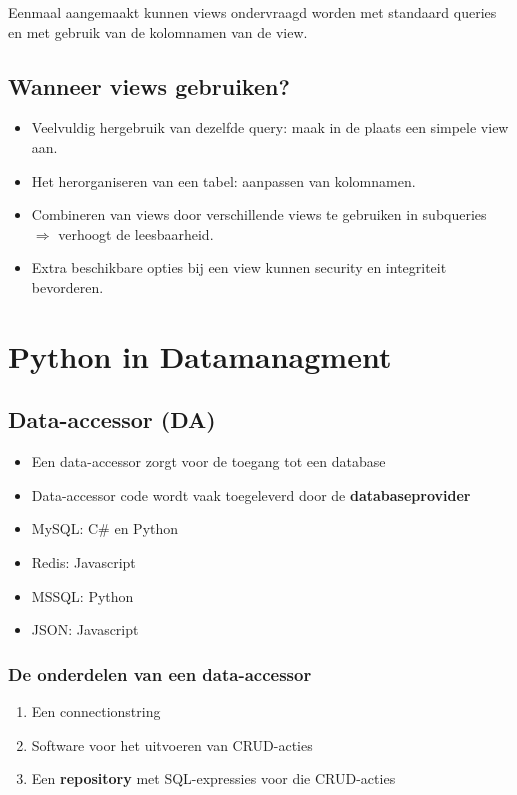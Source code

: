 \documentclass{article}
\newcommand{\bold}[1]{\textbf{#1}}
\begin{document}
Eenmaal aangemaakt kunnen views ondervraagd worden met standaard queries 
en met gebruik van de kolomnamen van de view.

\subsection{Wanneer views gebruiken?}
\begin{itemize}
    \item Veelvuldig hergebruik van dezelfde query: maak in de plaats een simpele view aan.
    \item Het herorganiseren van een tabel: aanpassen van kolomnamen. 
    \item Combineren van views door verschillende views te gebruiken in subqueries $\Rightarrow$ verhoogt de leesbaarheid.
    \item Extra beschikbare opties bij een view kunnen security en integriteit bevorderen.
\end{itemize}

\section{Python in Datamanagment}
\subsection{Data-accessor (DA)}
\begin{itemize}
    \item Een data-accessor zorgt voor de toegang tot een database
    \item Data-accessor code wordt vaak toegeleverd door de \bold{databaseprovider} 
    \item MySQL: C\# en Python
    \item Redis: Javascript
    \item MSSQL: Python
    \item JSON: Javascript
\end{itemize}

\subsubsection{De onderdelen van een data-accessor}
\begin{enumerate}
    \item Een connectionstring 
    \item Software voor het uitvoeren van CRUD-acties
    \item Een \bold{repository} met SQL-expressies voor die CRUD-acties
\end{enumerate}
\end{document}
